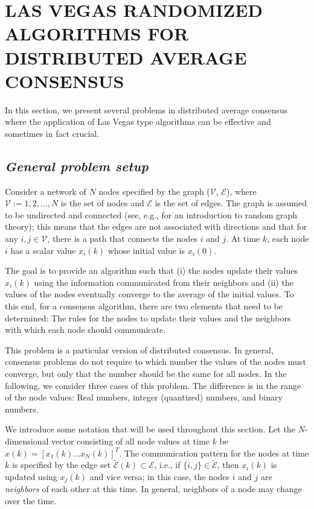 \documentclass[12pt]{article}
\begin{document}
	\section{LAS VEGAS RANDOMIZED ALGORITHMS FOR DISTRIBUTED AVERAGE CONSENSUS}
		In this section, we present several problems in distributed average consensus where the application of Las Vegas type algorithms can be effective and sometimes in fact crucial.
		
		\subsection{\textit{General problem setup}}
			Consider a network of $N$ nodes specified by the graph ($\mathscr{V}$, $\mathscr{E}$), where $\mathscr{V} := {1, 2, . . . , N }$ is the set of nodes and $\mathscr{E}$ is the set of edges. The graph is assumed to be undirected and connected (see, e.g., \cite{bib17} for an introduction to random graph theory); this means that the edges are not associated with directions and that for any $i, j \in \mathscr{V}$, there is a path that connects the nodes $i$ and $j$. At time $k$, each node $i$ has a scalar value $x_i(k)$ whose initial value is $x_i(0)$.
			\par
			The goal is to provide an algorithm such that (i) the nodes update their values $x_i(k)$ using the information communicated from their neighbors and (ii) the values of the nodes eventually converge to the average of the initial values. To this end, for a consensus algorithm, there are two elements that need to be determined: The rules for the nodes to update their values and the neighbors with which each node should communicate. 
			\par
			This problem is a particular version of distributed consensus. In general, consensus problems do not require to which number the values of the nodes must converge, but only that the number should be the same for all nodes. In the following, we consider three cases of this problem. The difference is in the range of the node values: Real numbers, integer (quantized) numbers, and binary numbers. 
			\par
			We introduce some notation that will be used throughout this section. Let the $N$-dimensional vector consisting of all node values at time $k$ be $x(k) = [x_1(k) \hdots x_N(k)]^T$. The communication pattern for the nodes at time $k$ is specified by the edge set $\tilde{\mathscr{E}}(k) \subset \mathscr{E}$, i.e., if $\{i, j\} \in \tilde{\mathscr{E}}$, then $x_i(k)$ is updated using $x_j(k)$ and vice versa; in this case, the nodes $i$ and $j$ are \emph{neighbors} of each other at this time. In general, neighbors of a node may change over the time.
\end{document}
